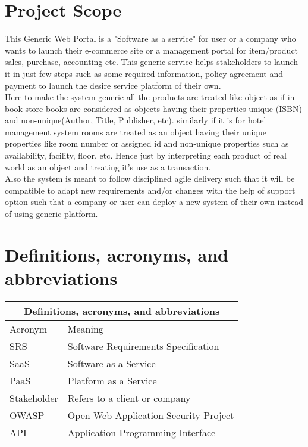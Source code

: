 \documentclass{report}
\begin{document}
\section{Project Scope}
\label{scope}
This Generic Web Portal is a "Software as a service" for user or a company who wants to launch their e-commerce site or a management portal for item/product sales, purchase, accounting etc. This generic service helps stakeholders to launch it in just few steps such as some required information, policy agreement and payment to launch the desire service platform of their own. \\
Here to make the system generic all the products are treated like object as if in book store books are considered as  objects having their properties unique (ISBN) and non-unique(Author, Title, Publisher, etc). similarly if it is for hotel management system rooms are treated as an object having their unique properties like room number or assigned id and non-unique properties such as availability, facility, floor, etc. Hence just by interpreting each product of real world as an object and treating it's use as a transaction.
\\
Also the system is meant to follow disciplined agile delivery such that it will be compatible to adapt new requirements and/or changes with the help of support option such that a company or user can deploy a new system of their own instead of using generic platform.

\section{Definitions, acronyms, and abbreviations}
\label{acronyms}
\begin{center}
\begin{tabular}{ |p{3cm}||p{9cm}|  }
	\hline
	\multicolumn{2}{|c|}{Definitions, acronyms, and abbreviations} \\
	\hline
	Acronym		&	Meaning	\\
	\hline
	SRS			&   Software Requirements Specification	\\
	SaaS		&   Software as a Service	\\
	PaaS		&	Platform as a Service	\\
	Stakeholder	&	Refers to a client or company	\\
	OWASP		&	Open Web Application Security Project	\\
	API			&	Application Programming Interface	\\

	\hline
\end{tabular}
\end{center}
\end{document}
